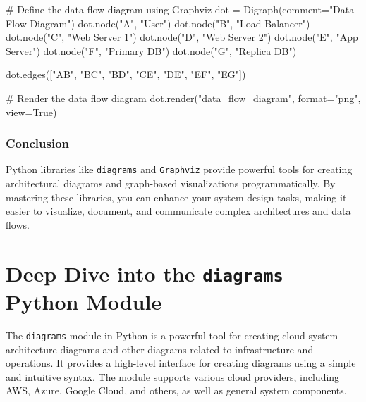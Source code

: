 \documentclass[
  letterpaper,
  DIV=11,
  numbers=noendperiod]{scrreprt}
\newenvironment{Shaded}{\begin{snugshade}}{\end{snugshade}}
\newcommand{\BuiltInTok}[1]{\textcolor[rgb]{0.00,0.23,0.31}{#1}}
\newcommand{\CommentTok}[1]{\textcolor[rgb]{0.37,0.37,0.37}{#1}}
\newcommand{\NormalTok}[1]{\textcolor[rgb]{0.00,0.23,0.31}{#1}}
\newcommand{\OperatorTok}[1]{\textcolor[rgb]{0.37,0.37,0.37}{#1}}
\newcommand{\StringTok}[1]{\textcolor[rgb]{0.13,0.47,0.30}{#1}}
\newcommand{\VariableTok}[1]{\textcolor[rgb]{0.07,0.07,0.07}{#1}}
\begin{document}
\begin{Shaded}
\begin{Highlighting}[]
\CommentTok{\# Define the data flow diagram using \textasciigrave{}Graphviz\textasciigrave{}}
\NormalTok{dot }\OperatorTok{=}\NormalTok{ Digraph(comment}\OperatorTok{=}\StringTok{"Data Flow Diagram"}\NormalTok{)}
\NormalTok{dot.node(}\StringTok{"A"}\NormalTok{, }\StringTok{"User"}\NormalTok{)}
\NormalTok{dot.node(}\StringTok{"B"}\NormalTok{, }\StringTok{"Load Balancer"}\NormalTok{)}
\NormalTok{dot.node(}\StringTok{"C"}\NormalTok{, }\StringTok{"Web Server 1"}\NormalTok{)}
\NormalTok{dot.node(}\StringTok{"D"}\NormalTok{, }\StringTok{"Web Server 2"}\NormalTok{)}
\NormalTok{dot.node(}\StringTok{"E"}\NormalTok{, }\StringTok{"App Server"}\NormalTok{)}
\NormalTok{dot.node(}\StringTok{"F"}\NormalTok{, }\StringTok{"Primary DB"}\NormalTok{)}
\NormalTok{dot.node(}\StringTok{"G"}\NormalTok{, }\StringTok{"Replica DB"}\NormalTok{)}

\NormalTok{dot.edges([}\StringTok{"AB"}\NormalTok{, }\StringTok{"BC"}\NormalTok{, }\StringTok{"BD"}\NormalTok{, }\StringTok{"CE"}\NormalTok{, }\StringTok{"DE"}\NormalTok{, }\StringTok{"EF"}\NormalTok{, }\StringTok{"EG"}\NormalTok{])}

\CommentTok{\# Render the data flow diagram}
\NormalTok{dot.render(}\StringTok{"data\_flow\_diagram"}\NormalTok{, }\BuiltInTok{format}\OperatorTok{=}\StringTok{"png"}\NormalTok{, view}\OperatorTok{=}\VariableTok{True}\NormalTok{)}
\end{Highlighting}
\end{Shaded}

\subsection{Conclusion}\label{conclusion-38}

Python libraries like \texttt{diagrams} and \texttt{Graphviz} provide
powerful tools for creating architectural diagrams and graph-based
visualizations programmatically. By mastering these libraries, you can
enhance your system design tasks, making it easier to visualize,
document, and communicate complex architectures and data flows.


\chapter{\texorpdfstring{Deep Dive into the \texttt{diagrams} Python
Module}{Deep Dive into the diagrams Python Module}}\label{deep-dive-into-the-diagrams-python-module}

The \texttt{diagrams} module in Python is a powerful tool for creating
cloud system architecture diagrams and other diagrams related to
infrastructure and operations. It provides a high-level interface for
creating diagrams using a simple and intuitive syntax. The module
supports various cloud providers, including AWS, Azure, Google Cloud,
and others, as well as general system components.
\end{document}
